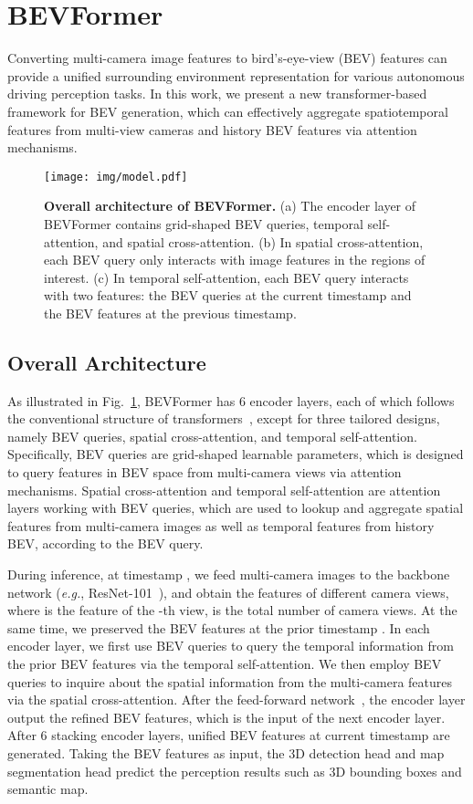 \documentclass{article}
\def\eg{\emph{e.g.}}
\begin{document}
\section{BEVFormer}
Converting multi-camera image features to bird's-eye-view (BEV) features can provide a unified surrounding environment representation for various autonomous driving perception tasks.
In this work, we present  a new transformer-based framework for BEV generation, which can effectively aggregate spatiotemporal features from multi-view cameras and history BEV features via attention mechanisms.


\begin{figure}[t]
\centering
\texttt{[image: img/model.pdf]}
\caption{\textbf{Overall architecture of BEVFormer.} (a) The encoder layer of BEVFormer contains grid-shaped BEV queries, temporal self-attention, and spatial cross-attention. (b) In spatial cross-attention, each BEV query only interacts with image features in the regions of interest. (c) In temporal self-attention, each BEV query interacts with two features: the BEV queries at the current timestamp and the BEV features at the previous  timestamp.}
\label{fig:model}
\end{figure}

\subsection{Overall Architecture}
As illustrated in Fig.~\ref{fig:model}, BEVFormer has 6 encoder layers, each of which follows the conventional structure of transformers~\cite{vaswani2017attention}, except for three tailored designs, namely BEV queries, spatial cross-attention, and temporal self-attention.
Specifically, BEV queries are grid-shaped learnable parameters, which is designed to query features in BEV space from multi-camera views via attention mechanisms. Spatial cross-attention and temporal self-attention are attention layers working with BEV queries, which are used
to lookup and aggregate spatial features from multi-camera images as well as temporal features from history BEV, according to the BEV query.



During inference, at timestamp , we feed multi-camera 
images to the backbone network (\eg, 
ResNet-101~\cite{he2016deep}), and obtain the features 
 of different camera 
views, where  is the feature of the -th view, 
 is the total number of camera views. 
At the same time, we preserved the BEV features  at the prior timestamp .
In each encoder layer, we first use BEV queries  to query the temporal information from the prior BEV features  via the temporal self-attention.
We then employ BEV queries  to inquire about the spatial information from the multi-camera features  via the spatial cross-attention. After the feed-forward network~\cite{vaswani2017attention}, the encoder layer output the refined BEV features, which is the input of the next encoder layer.
After 6 stacking encoder layers, unified BEV features  at current timestamp  are generated. Taking the BEV features  as input, the 3D detection head and map segmentation head predict the  perception results such as 3D bounding boxes and semantic map.
\end{document}
